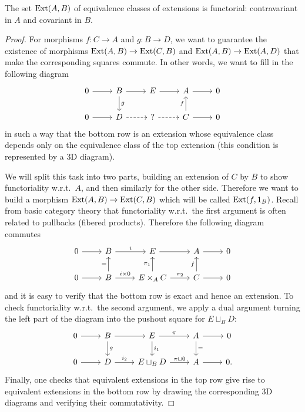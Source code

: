 \begin{thm}
    The set $\operatorname{Ext}(A,B)$ of equivalence classes of extensions is functorial: contravariant in $A$ and covariant in $B$.
\end{thm}
\begin{proof}
    For morphisms $f:C\to A$ and $g:B\to D$, we want to guarantee the existence of morphisms $\operatorname{Ext}(A,B)\to \operatorname{Ext}(C,B)$ and $\operatorname{Ext}(A,B)\to \operatorname{Ext}(A,D)$ that make the corresponding squares commute. In other words, we want to fill in the following diagram
    \[\begin{tikzcd}
        0\arrow[r] & B\arrow[r]\arrow[d,"g"] & E \arrow[r] & A\arrow[r] & 0 \\
        0\arrow[r] & D\arrow[r,dashed]       & ?  \arrow[r,dashed]    & C\arrow[r] \arrow[u,"f"] & 0
    \end{tikzcd}\]
    in such a way that the bottom row is an extension whose equivalence class depends only on the equivalence class of the top extension (this condition is represented by a 3D diagram).

    We will split this task into two parts, building an extension of $C$ by $B$ to show functoriality w.r.t.\ $A$, and then similarly for the other side. Therefore we want to build  a morphism $\operatorname{Ext}(A,B)\to \operatorname{Ext}(C,B)$ which will be called $\operatorname{Ext}(f,1_B)$. Recall from basic category theory that functoriality w.r.t.\ the first argument is often related to pullbacks (fibered products). Therefore the following diagram commutes
    \[\begin{tikzcd}
        0\arrow[r] & B\arrow[r,"i"] & E \arrow[r] & A\arrow[r] & 0 \\
        0\arrow[r] & B\arrow[r,"i\times 0"]\arrow[u,"="]       & E\times_A C  \arrow[r,"\pi_2"]\arrow[u,"\pi_1"]    & C\arrow[r] \arrow[u,"f"] & 0
    \end{tikzcd}\]
    and it is easy to verify that the bottom row is exact and hence an extension. To check functoriality w.r.t.\ the second argument, we apply a dual argument turning the left part of the diagram into the pushout square for $E\sqcup_B D$:
    \[\begin{tikzcd}
        0\arrow[r] & B\arrow[r]\arrow[d,"g"] & E \arrow[r,"\pi"]\arrow[d,"i_1"] & A\arrow[r]\arrow[d,"="] & 0 \\
        0\arrow[r] & D\arrow[r,"i_2"]      & E\sqcup_B D  \arrow[r,"\pi\sqcup 0"] & A\arrow[r] & 0.
    \end{tikzcd}\]
    Finally, one checks that equivalent extensions in the top row give rise to equivalent extensions in the bottom row by drawing the corresponding 3D diagrams and verifying their commutativity.
\end{proof}

